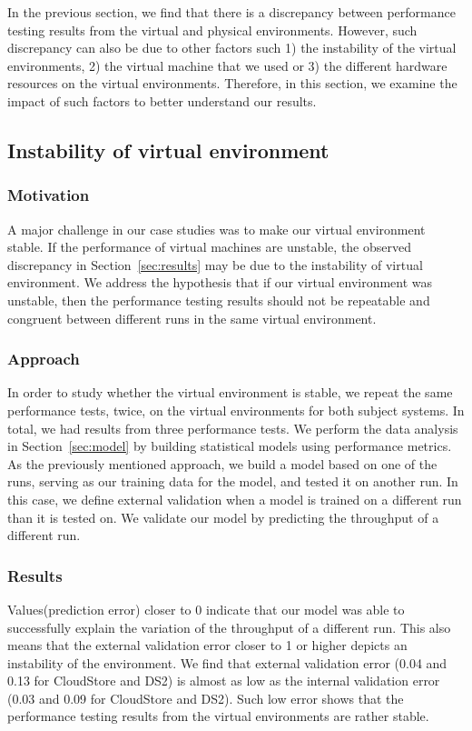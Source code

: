 
In the previous section, we find that there is a discrepancy between performance testing results from the virtual and physical environments. However, such discrepancy can also be due to other factors such 1) the instability of the virtual environments, 2) the virtual machine that we used or 3) the different hardware resources on the virtual environments. Therefore, in this section, we examine the impact of such factors to better understand our results. 


\subsection{Instability of virtual environment}

\subsubsection{Motivation}

A major challenge in our case studies was to make our virtual environment stable. If the performance of virtual machines are unstable, the observed discrepancy in Section~\ref{sec:results} may be due to the instability of virtual environment. We address the hypothesis that if our virtual environment was unstable, then the performance testing results should not be repeatable and congruent between different runs in the same virtual environment. 

\subsubsection{Approach}

In order to study whether the virtual environment is stable, we repeat the same performance tests, twice, on the virtual environments for both subject systems. In total, we had results from three performance tests. We perform the data analysis in Section~\ref{sec:model} by building statistical models using performance metrics. %
As the previously mentioned approach, we build a model based on one of the runs, serving as our training data for the model, and tested it on another run. In this case, we define external validation when a model is trained on a different run than it is tested on. We validate our model by predicting the throughput of a different run.  
 
 \subsubsection{Results}
Values(prediction error) closer to 0 indicate that our model was able to successfully explain the variation of the throughput of a different run. This also means that the external validation error closer to 1 or higher depicts an instability of the environment. We find that external validation error (0.04 and 0.13 for CloudStore and DS2) is almost as low as the internal validation error (0.03 and 0.09 for CloudStore and DS2). Such low error shows that the performance testing results from the virtual environments are rather stable. 

